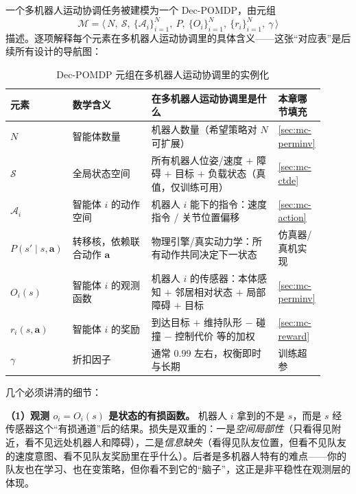 一个多机器人运动协调任务被建模为一个 Dec-POMDP，由元组
\begin{equation}
  \mathcal{M}=\big\langle\, N,\ \mathcal{S},\ \{\mathcal{A}_i\}_{i=1}^N,\ P,\ \{O_i\}_{i=1}^N,\ \{r_i\}_{i=1}^N,\ \gamma \,\big\rangle
  \label{eq:mc-decpomdp}
\end{equation}
描述\cite{bernstein2002decpomdp}。逐项解释每个元素在多机器人运动协调里的具体含义——这张“对应表”是后续所有设计的导航图：

\begin{table}[H]\centering\small
\caption{Dec-POMDP 元组在多机器人运动协调里的实例化}
\label{tab:mc-decpomdp}
\begin{tabular}{p{0.10\linewidth}p{0.26\linewidth}p{0.42\linewidth}p{0.13\linewidth}}
\toprule
元素 & 数学含义 & 在多机器人运动协调里是什么 & 本章哪节填充 \\
\midrule
$N$ & 智能体数量 & 机器人数量（希望策略对 $N$ 可扩展） & \cref{sec:mc-perminv} \\
$\mathcal{S}$ & 全局状态空间 & 所有机器人位姿/速度 $+$ 障碍 $+$ 目标 $+$ 负载状态（真值，仅训练可用） & \cref{sec:mc-ctde} \\
$\mathcal{A}_i$ & 智能体 $i$ 的动作空间 & 机器人 $i$ 能下的指令：速度指令 / 关节位置偏移 & \cref{sec:mc-action} \\
$P(s'\mid s,\mathbf{a})$ & 转移核，依赖联合动作 $\mathbf{a}$ & 物理引擎/真实动力学：所有动作共同决定下一状态 & 仿真器/真机实现 \\
$O_i(s)$ & 智能体 $i$ 的观测函数 & 机器人 $i$ 的传感器：本体感知 $+$ 邻居相对状态 $+$ 局部障碍 $+$ 目标 & \cref{sec:mc-perminv} \\
$r_i(s,\mathbf{a})$ & 智能体 $i$ 的奖励 & 到达目标 $+$ 维持队形 $-$ 碰撞 $-$ 控制代价 等的加权 & \cref{sec:mc-reward} \\
$\gamma$ & 折扣因子 & 通常 $0.99$ 左右，权衡即时与长期 & 训练超参 \\
\bottomrule
\end{tabular}
\end{table}

\noindent 几个必须讲清的细节：

\textbf{（1）观测 $o_i=O_i(s)$ 是状态的有损函数。} 机器人 $i$ 拿到的不是 $s$，而是 $s$ 经传感器这个“有损通道”后的结果。损失是双重的：一是\emph{空间局部性}（只看得见附近，看不见远处机器人和障碍），二是\emph{信息缺失}（看得见队友位置，但看不见队友的速度意图、看不见队友奖励里在乎什么）。后者是多机器人特有的难点——你的队友也在学习、也在变策略，但你看不到它的“脑子”，这正是非平稳性在观测层的体现。


